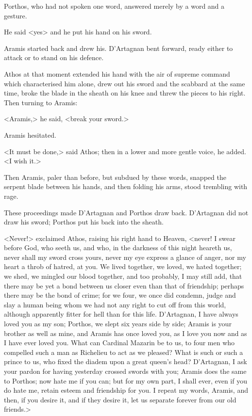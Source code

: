 Porthos, who had not spoken one word, answered merely by a word and a gesture.

He said <yes> and he put his hand on his sword.

Aramis started back and drew his. D'Artagnan bent forward, ready either to attack or to stand on his defence.

Athos at that moment extended his hand with the air of supreme command which characterised him alone, drew out his sword and the scabbard at the same time, broke the blade in the sheath on his knee and threw the pieces to his right. Then turning to Aramis:

<Aramis,> he said, <break your sword.>

Aramis hesitated.

<It must be done,> said Athos; then in a lower and more gentle voice, he added. <I wish it.>

Then Aramis, paler than before, but subdued by these words, snapped the serpent blade between his hands, and then folding his arms, stood trembling with rage.

These proceedings made D'Artagnan and Porthos draw back. D'Artagnan did not draw his sword; Porthos put his back into the sheath.

<Never!> exclaimed Athos, raising his right hand to Heaven, <never! I swear before God, who seeth us, and who, in the darkness of this night heareth us, never shall my sword cross yours, never my eye express a glance of anger, nor my heart a throb of hatred, at you. We lived together, we loved, we hated together; we shed, we mingled our blood together, and too probably, I may still add, that there may be yet a bond between us closer even than that of friendship; perhaps there may be the bond of crime; for we four, we once did condemn, judge and slay a human being whom we had not any right to cut off from this world, although apparently fitter for hell than for this life. D'Artagnan, I have always loved you as my son; Porthos, we slept six years side by side; Aramis is your brother as well as mine, and Aramis has once loved you, as I love you now and as I have ever loved you. What can Cardinal Mazarin be to us, to four men who compelled such a man as Richelieu to act as we pleased? What is such or such a prince to us, who fixed the diadem upon a great queen's head? D'Artagnan, I ask your pardon for having yesterday crossed swords with you; Aramis does the same to Porthos; now hate me if you can; but for my own part, I shall ever, even if you do hate me, retain esteem and friendship for you. I repeat my words, Aramis, and then, if you desire it, and if they desire it, let us separate forever from our old friends.>

